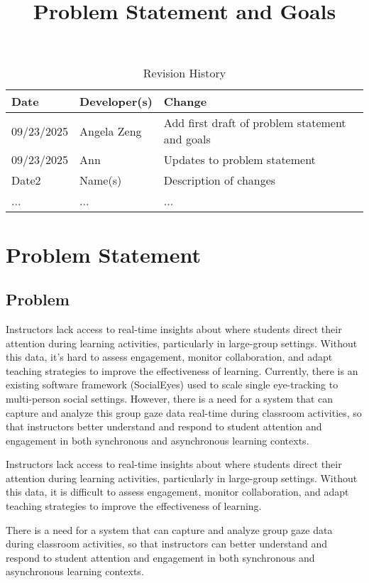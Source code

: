 \documentclass{article}
\title{Problem Statement and Goals\\\progname}
\author{\authname}
\date{}
\begin{document}
\maketitle

\begin{table}[hp]
\caption{Revision History} \label{TblRevisionHistory}
\begin{tabularx}{\textwidth}{llX}
\toprule
\textbf{Date} & \textbf{Developer(s)} & \textbf{Change}\\
\midrule
09/23/2025 & Angela Zeng & Add first draft of problem statement and goals\\
09/23/2025 & Ann & Updates to problem statement \\
Date2 & Name(s) & Description of changes\\
... & ... & ...\\
\bottomrule
\end{tabularx}
\end{table}

\section{Problem Statement}
\subsection{Problem}
Instructors lack access to real-time insights about where students direct their attention during learning activities, particularly in large-group settings. Without this data, it's hard to assess engagement, monitor collaboration, and adapt teaching strategies to improve the effectiveness of learning. Currently, there is an existing software framework (SocialEyes) used to scale single eye-tracking to multi-person social settings. However, there is a need for a system that can capture and analyze this group gaze data real-time during classroom activities, so that instructors better understand and respond to student attention and engagement in both synchronous and asynchronous learning contexts. 


Instructors lack access to real-time insights about where students direct their 
attention during learning activities, particularly in large-group settings. Without 
this data, it is difficult to assess engagement, monitor collaboration, and adapt 
teaching strategies to improve the effectiveness of learning. 

There is a need for a system that can capture and analyze group gaze data during 
classroom activities, so that instructors can better understand and respond to 
student attention and engagement in both synchronous and asynchronous 
learning contexts.
\end{document}
